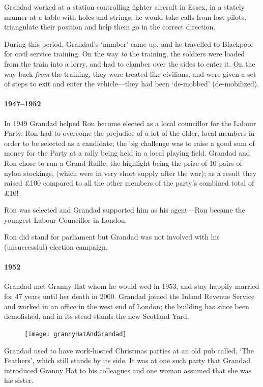 Grandad worked at a station controlling fighter aircraft in Essex, in a stately manner at a table
with holes and strings; he would take calls from lost pilots, triangulate their position
and help them go in the correct direction.

During this period, Grandad's `number' came up, and he travelled to Blackpool for
civil service training. On the way \emph{to} the training, the soldiers were loaded from
the train into a lorry, and had to clamber over the sides to enter it. On the
way back \emph{from} the training, they were treated like civilians, and were
given a set of steps to exit and enter the vehicle---they had been `de-mobbed' (de-mobilized).

\paragraph{1947--1952} In 1949 Grandad helped Ron become elected as a local
councillor for the Labour Party.  Ron had to overcome the
prejudice of a lot of the older, local members in order to be selected as a candidate; the big challenge was
to raise a good sum of money for the Party at a rally being held
in a local playing field.
Grandad and Ron chose to run a Grand Raffle, the highlight being the
prize of 10 pairs of nylon stockings, (which were in very short supply
after the war); as a result they
raised \pounds100 compared to all the other members of the party's combined
total of \pounds10!

Ron was selected and Grandad supported him as his agent---Ron became
the youngest Labour Councillor in London.

Ron did stand for parliament but Grandad was not
involved with his (unsuccessful) election campaign.

\paragraph{1952} Grandad met Granny Hat whom he would wed in 1953, and stay
happily married for 47 years until her death in 2000.
Grandad joined the Inland Revenue Service and worked in an office
in the west end of London; the building has since been demolished, and in its stead
stands the new Scotland Yard.

\begin{figure}
	\centering
	\texttt{[image: grannyHatAndGrandad]}
\end{figure}
Grandad used to have work-hosted Christmas parties at an old pub called, `The Feathers', which still stands by its side.
It was at one such party that Grandad introduced Granny Hat to his colleagues and one woman
assumed that she was his sister.

